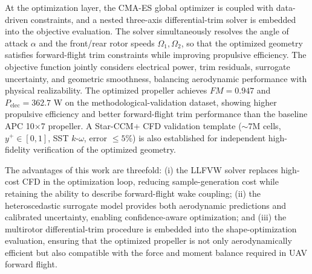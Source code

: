 \begin{eabstract}
At the optimization layer, the CMA-ES global optimizer is coupled with data-driven constraints, and a nested three-axis differential-trim solver is embedded into the objective evaluation. The solver simultaneously resolves the angle of attack $\alpha$ and the front/rear rotor speeds $\Omega_1,\Omega_2$, so that the optimized geometry satisfies forward-flight trim constraints while improving propulsive efficiency. The objective function jointly considers electrical power, trim residuals, surrogate uncertainty, and geometric smoothness, balancing aerodynamic performance with physical realizability. The optimized propeller achieves $FM=0.947$ and $P_{\text{elec}}=362.7$ W on the methodological-validation dataset, showing higher propulsive efficiency and better forward-flight trim performance than the baseline APC 10$\times$7 propeller. A Star-CCM+ CFD validation template ($\sim 7$M cells, $y^+ \in [0,1]$, SST $k$-$\omega$, error $\leq 5\%$) is also established for independent high-fidelity verification of the optimized geometry.

The advantages of this work are threefold: (i) the LLFVW solver replaces high-cost CFD in the optimization loop, reducing sample-generation cost while retaining the ability to describe forward-flight wake coupling; (ii) the heteroscedastic surrogate model provides both aerodynamic predictions and calibrated uncertainty, enabling confidence-aware optimization; and (iii) the multirotor differential-trim procedure is embedded into the shape-optimization evaluation, ensuring that the optimized propeller is not only aerodynamically efficient but also compatible with the force and moment balance required in UAV forward flight.

\end{eabstract}
